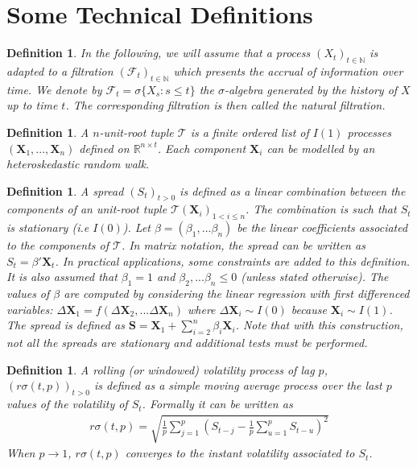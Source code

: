 \documentclass[11pt,a4,twosided,singlespacing,titlepagenumber=on]{scrreprt}
\numberwithin{equation}{chapter} %
\newtheorem{definition}[theorem]{Definition}%
\theoremstyle{remark}
\newcommand{\matr}[1]{\mathbf{#1}}
\begin{document}
\section{Some Technical Definitions}

\begin{definition}
In the following, we will assume that a process $(X_t)_{t \in \mathbb{N}}$ is adapted to a filtration $(\mathcal{F}_t)_{t \in \mathbb{N}}$ which presents the accrual of information over time. We denote by $\mathcal{F}_t = \sigma \{X_s : s \leq t \}$ the $\sigma$-algebra generated by the history of $X$ up to time $t$. The corresponding filtration is then called the natural filtration.
\end{definition}

\begin{definition}
A $n$-unit-root tuple $\mathcal{T}$ is a finite ordered list of $I(1)$ processes $(\matr{X}_1, ..., \matr{X}_n)$ defined on $\mathbb{R}^{n \times t}$. Each component $\matr{X}_i$ can be modelled by an heteroskedastic random walk. \label{definition_tuple}
\end{definition}

\begin{definition}
\label{spread_def}
A spread $(S_t)_{t>0}$ is defined as a linear combination between the components of an unit-root tuple $\mathcal{T} (\matr{X}_i)_{1 < i \leq n}$. The combination is such that $S_t$ is stationary (i.e $I(0)$). Let $\beta = (\beta_1,...\beta_n)$ be the linear coefficients associated to the components of $\mathcal{T}$. In matrix notation, the spread can be written as $S_t = \beta' \matr{X}_t$. In practical applications, some constraints are added to this definition. It is also assumed that $\beta_1 = 1$ and $\beta_2,...\beta_n \leq 0$ (unless stated otherwise). The values of $\beta$ are computed by considering the linear regression with first differenced variables: $\Delta \matr{X}_1 = f(\Delta \matr{X}_2,...\Delta \matr{X}_n)$ where $\Delta \matr{X}_i \sim I(0)$ because $\matr{X}_i \sim I(1)$. The spread is defined as $\matr{S} = \matr{X}_1 + \sum_{i=2}^n \beta_i \matr{X}_i$. Note that with this construction, not all the spreads are stationary and additional tests must be performed.
\end{definition}

\begin{definition}
A rolling (or windowed) volatility process of lag $p$, $(r\sigma(t,p))_{t>0}$ is defined as a simple moving average process over the last $p$ values of the volatility of $S_t$. Formally it can be written as
\begin{align*}
r\sigma(t,p) = \sqrt{\frac{1}{p} \sum_{j=1}^p \left(S_{t-j} - \frac{1}{p}\sum_{u=1}^p S_{t-u} \right)^2}
\end{align*}
When $p \rightarrow 1$, $r\sigma(t,p)$ converges to the instant volatility associated to $S_t$. \label{windowed_volatility}
\end{definition}
\end{document}

